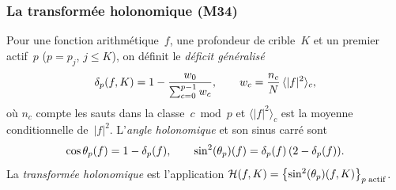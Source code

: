 \documentclass[12pt,a4paper]{article}
\begin{document}
\subsubsection{La transformée holonomique (M34)}
\label{sec:ms_holonomic_transform}

\begin{definition}
\label{def:holonomic_transform}
Pour une fonction arithmétique~$f$, une profondeur de crible~$K$ et
un premier actif~$p$ ($p = p_j$, $j \leq K$), on définit le
\emph{déficit généralisé}
\begin{equation}
  \delta_{p}(f,K) = 1 - \frac{w_0}{\sum_{c=0}^{p-1} w_c},
  \qquad
  w_c = \frac{n_c}{N}\,\langle |f|^2 \rangle_c,
  \label{eq:holonomic_deficit}
\end{equation}
où $n_c$ compte les sauts dans la classe~$c \bmod p$ et
$\langle |f|^2 \rangle_c$ est la moyenne conditionnelle de~$|f|^2$.
L'\emph{angle holonomique} et son sinus carré sont
\begin{equation}
  \cos\theta_p(f) = 1 - \delta_{p}(f),
  \qquad
  \sin^2(\theta_{p})(f) = \delta_{p}(f)\,(2 - \delta_{p}(f)).
  \label{eq:holonomic_angle}
\end{equation}
La \emph{transformée holonomique} est l'application
$\mathcal{H}(f,K) = \bigl\{\sin^2(\theta_{p})(f,K)\bigr\}_{p\;\text{actif}}$.
\end{definition}
\end{document}

